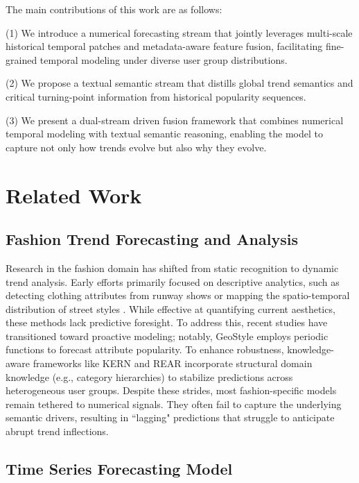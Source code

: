 \documentclass[Afour,sageh,times]{sagej}
\begin{document}
{The main contributions of this work are as follows:

(1) We introduce a numerical forecasting stream that jointly leverages multi-scale historical temporal patches and metadata-aware feature fusion, facilitating fine-grained temporal modeling under diverse user group distributions.

(2) We propose a textual semantic stream that distills global trend semantics and critical turning-point information from historical popularity sequences.

(3) We present a dual-stream driven fusion framework that combines numerical temporal modeling with textual semantic reasoning, enabling the model to capture not only how trends evolve but also why they evolve.

\section{Related Work}
\subsection{Fashion Trend Forecasting and Analysis}
Research in the fashion domain has shifted from static recognition to dynamic trend analysis. Early efforts primarily focused on descriptive analytics, such as detecting clothing attributes from runway shows \cite{vittayakorn2015runway, al2017fashion} or mapping the spatio-temporal distribution of street styles \cite{mall2019geostyle, matzen2017streetstyle}. While effective at quantifying current aesthetics, these methods lack predictive foresight. To address this, recent studies have transitioned toward proactive modeling; notably, GeoStyle \cite{mall2019geostyle} employs periodic functions to forecast attribute popularity. To enhance robustness, knowledge-aware frameworks like KERN \cite{ma2020knowledge} and REAR \cite{ding2021leveraging} incorporate structural domain knowledge (e.g., category hierarchies) to stabilize predictions across heterogeneous user groups. Despite these strides, most fashion-specific models remain tethered to numerical signals. They often fail to capture the underlying semantic drivers, resulting in ``lagging" predictions that struggle to anticipate abrupt trend inflections.

\subsection{Time Series Forecasting Model}

}
\end{document}
